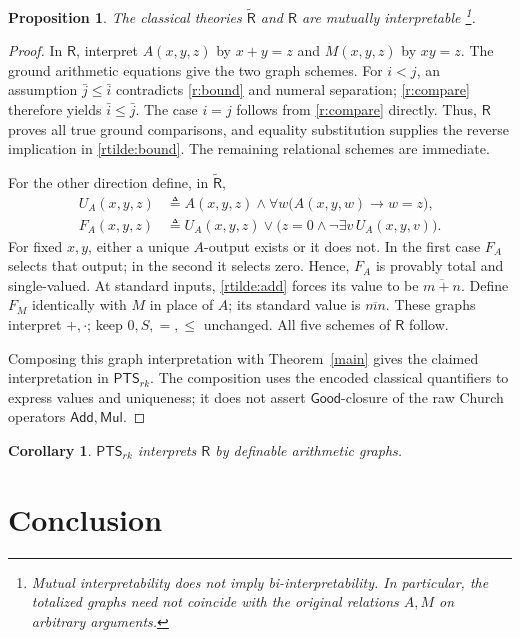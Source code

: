 \documentclass{article}
\newtheorem{proposition}[lemma]{Proposition}
\newtheorem{corollary}{Corollary}
\theoremstyle{definition}
\theoremstyle{remark}
\newcommand{\PTS}{\mathsf{PTS}_{rk}}
\newcommand{\Rt}{\widetilde{\mathsf R}}
\newcommand{\R}{\mathsf R}
\newcommand{\Good}{\mathsf{Good}}
\newcommand{\Add}{\mathsf{Add}}
\newcommand{\Mul}{\mathsf{Mul}}
\begin{document}
\begin{proposition}
    The classical theories $\Rt$ and $\R$ are mutually
    interpretable \footnote{Mutual interpretability
    does not imply bi-interpretability. In particular,
    the totalized graphs need not coincide with the
    original relations $A,M$ on arbitrary arguments.}.
\end{proposition}
\begin{proof}
    In $\R$, interpret $A(x,y,z)$ by $x+y=z$ and
    $M(x,y,z)$ by $xy=z$. The ground arithmetic
    equations give the two graph schemes. For $i<j$, an
    assumption $\bar j\le\bar i$ contradicts
    \eqref{r:bound} and numeral separation;
    \eqref{r:compare} therefore yields
    $\bar i\le\bar j$. The case $i=j$ follows from
    \eqref{r:compare} directly. Thus, $\R$ proves all
    true ground comparisons, and equality substitution
    supplies the reverse implication in
    \eqref{rtilde:bound}. The remaining relational
    schemes are immediate.

    For the other direction define, in $\Rt$,
    \begin{align*}
        U_A(x,y,z)&\triangleq A(x,y,z)\land
        \forall w\bigl(A(x,y,w)\to w=z\bigr),\\
        F_A(x,y,z)&\triangleq U_A(x,y,z)\lor
        \bigl(z=0\land\neg\exists v\,U_A(x,y,v)\bigr).
    \end{align*}
    For fixed $x,y$, either a unique $A$-output exists
    or it does not. In the first case $F_A$ selects
    that output; in the second it selects zero. Hence,
    $F_A$ is provably total and single-valued. At
    standard inputs, \eqref{rtilde:add} forces its
    value to be $\overline{m+n}$. Define $F_M$
    identically with $M$ in place of $A$; its standard
    value is $\overline{mn}$. These graphs interpret
    $+,\cdot$; keep $0,S,=,\le$ unchanged. All five
    schemes of $\R$ follow.

    Composing this graph interpretation with
    Theorem~\ref{main} gives the claimed interpretation
    in $\PTS$. The composition uses the encoded
    classical quantifiers to express values and
    uniqueness; it does not assert $\Good$-closure of
    the raw Church operators $\Add,\Mul$.
\end{proof}

\begin{corollary}
    $\PTS$ interprets $\R$
    by definable arithmetic graphs.
\end{corollary}

\section{Conclusion}
\end{document}
